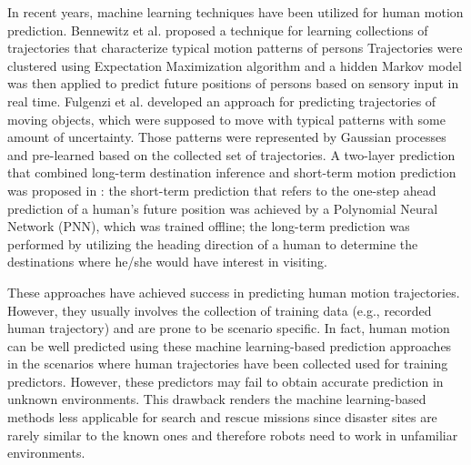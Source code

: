 \documentclass[letterpaper, 10 pt, conference]{ieeeconf}
\newcommand{\todohere}[1]{\hl{(\textbf{TODO:} #1)}}
\begin{document}
	In recent years, machine learning techniques have been utilized for human motion prediction.
	Bennewitz et al. \cite{bennewitz2005learning} proposed a technique for learning collections of trajectories that characterize typical motion patterns of persons
	Trajectories were clustered using Expectation Maximization algorithm and a hidden Markov model was then applied to predict future positions of persons based on sensory input in real time.
	Fulgenzi et al. \cite{fulgenzi2008probabilistic} developed an approach for predicting trajectories of moving objects, which were supposed
	to move with typical patterns with some amount of uncertainty. 
	Those patterns were represented by Gaussian processes and pre-learned based on the collected set of trajectories.
	A two-layer prediction that combined long-term destination inference and short-term motion prediction was proposed in \cite{foka2010probabilistic}:
	the short-term prediction that refers to the one-step ahead prediction of a human’s future position was achieved by a Polynomial Neural Network (PNN), which was trained offline;
	the long-term prediction was performed by utilizing the heading direction of a human to determine the destinations where he/she would have interest in visiting.
	
	These approaches have achieved success in predicting human motion trajectories.
	However, they usually involves the collection of training data (e.g., recorded human trajectory) and are prone to be scenario specific. 
	In fact, human motion can be well predicted using these machine learning-based prediction approaches in the scenarios where human trajectories have been collected used for training predictors.
	However, these predictors may fail to obtain accurate prediction in unknown environments.
	This drawback renders the machine learning-based methods less applicable for search and rescue missions since disaster sites are rarely similar to the known ones and therefore robots need to work in unfamiliar environments.
	
\end{document}
